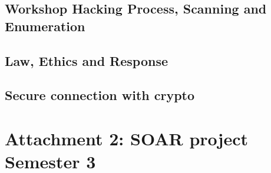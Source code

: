 \documentclass[12pt, letterpaper]{article}
\begin{document}
\subsection{Workshop Hacking Process, Scanning and Enumeration}

\newpage
\subsection{Law, Ethics and Response}


\newpage
\subsection{Secure connection with crypto}

\newpage
\section{Attachment 2: SOAR project Semester 3}
\label{soarpdf}

\end{document}
